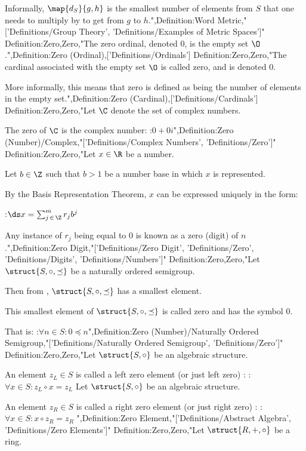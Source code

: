 Informally, $\map {d_S} {g, h}$ is the smallest number of elements from $S$ that one needs to multiply by to get from $g$ to $h$.",Definition:Word Metric,"['Definitions/Group Theory', 'Definitions/Examples of Metric Spaces']"
Definition:Zero,Zero,"The zero ordinal, denoted $0$, is the empty set $\O$.",Definition:Zero (Ordinal),['Definitions/Ordinals']
Definition:Zero,Zero,"The cardinal associated with the empty set $\O$ is called zero, and is denoted $0$.


More informally, this means that zero is defined as being the number of elements in the empty set.",Definition:Zero (Cardinal),['Definitions/Cardinals']
Definition:Zero,Zero,"Let $\C$ denote the set of complex numbers.

The zero of $\C$ is the complex number:
:$0 + 0 i$",Definition:Zero (Number)/Complex,"['Definitions/Complex Numbers', 'Definitions/Zero']"
Definition:Zero,Zero,"Let $x \in \R$ be a number.

Let $b \in \Z$ such that $b > 1$ be a number base in which $x$ is represented.

By the Basis Representation Theorem, $x$ can be expressed uniquely in the form:

:$\ds x = \sum_{j \mathop \in \Z}^m r_j b^j$


Any instance of $r_j$ being equal to $0$ is known as a zero (digit) of $n$.",Definition:Zero Digit,"['Definitions/Zero Digit', 'Definitions/Zero', 'Definitions/Digits', 'Definitions/Numbers']"
Definition:Zero,Zero,"Let $\struct {S, \circ, \preceq}$ be a naturally ordered semigroup.

Then from , $\struct {S, \circ, \preceq}$ has a smallest element.


This smallest element of $\struct {S, \circ, \preceq}$ is called zero and has the symbol $0$.

That is:
:$\forall n \in S: 0 \preceq n$",Definition:Zero (Number)/Naturally Ordered Semigroup,"['Definitions/Naturally Ordered Semigroup', 'Definitions/Zero']"
Definition:Zero,Zero,"Let $\struct {S, \circ}$ be an algebraic structure.

An element $z_L \in S$ is called a left zero element (or just left zero) :
:$\forall x \in S: z_L \circ x = z_L$
Let $\struct {S, \circ}$ be an algebraic structure.

An element $z_R \in S$ is called a right zero element (or just right zero) :
:$\forall x \in S: x \circ z_R = z_R$
",Definition:Zero Element,"['Definitions/Abstract Algebra', 'Definitions/Zero Elements']"
Definition:Zero,Zero,"Let $\struct {R, +, \circ}$ be a ring.

